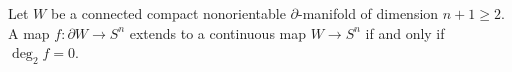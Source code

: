 Let $W$ be a connected compact nonorientable $\partial$-manifold of dimension $n + 1 \geqslant 2$. A map $f: \partial W \to S^n$ extends to a continuous map $W \to S^n$ if and only if $\deg_2 f = 0$.

